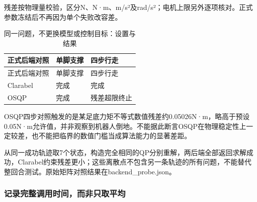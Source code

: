 残差按物理量校验，区分N、N·m、m/s²及rad/s²；电机上限另外逐项核对。正式参数冻结后不再因为单个失败改容差。

\FloatBarrier\begingroup\small\setlength{\tabcolsep}{2.5pt}
\begin{longtable}[]{@{}
  >{\raggedright\arraybackslash}p{}
  >{\raggedright\arraybackslash}p{}
  >{\raggedright\arraybackslash}p{}@{}}
\caption{同一问题，不更换模型或控制目标：设置与结果}\label{tab:s27-1}\tabularnewline
\toprule\noalign{}
\begin{minipage}[b]{\linewidth}\raggedright
正式后端对照
\end{minipage} & \begin{minipage}[b]{\linewidth}\raggedright
单脚支撑
\end{minipage} & \begin{minipage}[b]{\linewidth}\raggedright
四步行走
\end{minipage} \\
\midrule\noalign{}
\endfirsthead
\toprule\noalign{}
\begin{minipage}[b]{\linewidth}\raggedright
正式后端对照
\end{minipage} & \begin{minipage}[b]{\linewidth}\raggedright
单脚支撑
\end{minipage} & \begin{minipage}[b]{\linewidth}\raggedright
四步行走
\end{minipage} \\
\midrule\noalign{}
\endhead
\bottomrule\noalign{}
\endlastfoot
Clarabel & 完成 & 完成 \\
OSQP & 完成 & 残差超限终止 \\
\end{longtable}\endgroup

OSQP四步对照触发的是某足底力矩不等式数值残差约0.05026N·m，略高于预设0.05N·m允许值，并非观察到机器人倒地。不能据此断言OSQP在物理稳定性上一定较差，也不能把临界的数值门槛当成算法能力的显著差距。

从同一成功轨迹取7个状态，构造完全相同的QP分别重解，两后端全部返回求解成功，Clarabel约束残差更小；这些离散点不包含另一条轨迹的所有问题，不能替代整回合测试。原始矩阵对照结果在backend\_probe.json。

\subsubsection{记录完整调用时间，而非只取平均}\label{s27-detail-3}


